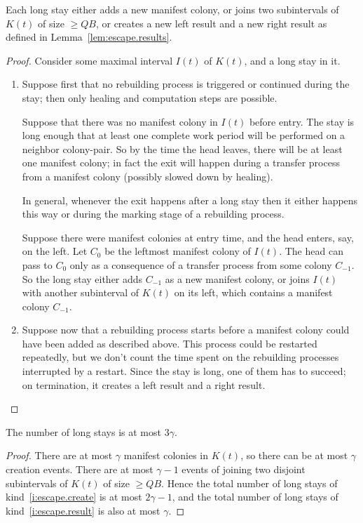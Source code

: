 \documentclass[11pt]{memoir}
\theoremstyle{definition} %
\renewcommand{\ge}{\geq}
\def\B{B}
\newcommand{\Q}{Q} %
\begin{document}
\begin{lemma}\label{lem:escape.long-stays}
Each long stay either adds a new manifest colony, or
  joins two subintervals of \( K(t) \) of size \( \ge\Q\B \), or creates 
  a new left result and a new right result as defined in Lemma~\ref{lem:escape.results}.
\end{lemma}
\begin{proof}
  Consider some maximal interval \( I(t) \) of \( K(t) \), and a long stay in it.
  \begin{enumerate}
  \item\label{i:escape.create}
  Suppose first that no rebuilding process 
  is triggered or continued during the stay; then
  only healing and computation steps are possible.
  
  Suppose that there was no manifest colony in \( I(t) \) before entry.
  The stay is long enough that at least one complete work period will be performed on
  a neighbor colony-pair.
  So by the time the head leaves, there will be at least one manifest colony; in fact the
  exit will happen during a transfer process from a manifest colony (possibly slowed down
  by healing).
  
  In general, whenever the exit happens after a long stay
  then it either happens this way or during the marking stage of
  a rebuilding process.

  Suppose there were manifest colonies at entry time, and the head enters, say, on the left.
  Let \( C_{0} \) be the leftmost manifest colony of \( I(t) \).
  The head can pass to \( C_{0} \) only as a consequence of a
  transfer process from some colony \( C_{-1} \).
  So the long stay either adds \( C_{-1} \) as a new
  manifest colony, or joins \( I(t) \) with another subinterval of \( K(t) \) on its left, which
  contains a manifest colony \( C_{-1} \).
  
\item\label{i:escape.result}
  Suppose now that a rebuilding process starts before a manifest colony could have
  been added as described above.
  This process could be restarted repeatedly,
  but we don't count the time spent on the rebuilding processes interrupted by a restart.
  Since the stay is long, one of them has to succeed; on termination,
  it creates a left result and a right result.
\end{enumerate}  
\end{proof}

\begin{corollary}\label{crl:escape.long-stays}
  The number of long stays is at most \( 3\gamma \).
\end{corollary}
  \begin{proof}
  There are at most \( \gamma \) manifest colonies in \( K(t) \), so
  there can be at most \( \gamma \) creation events.
  There are at most \( \gamma-1 \) events of
  joining two disjoint subintervals of \( K(t) \) of size \( \ge\Q\B \).
  Hence the total number of long stays of kind~\ref{i:escape.create} is at most \( 2\gamma-1 \),
  and the total number of long stays of kind~\ref{i:escape.result}
  is also at most \( \gamma \).
  \end{proof}
\end{document}
